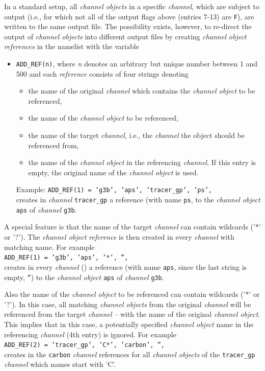 \documentclass[twoside]{article}
\begin{document}
{In a standard setup, all {\it channel objects} in a specific {\it channel},
which are subject to output (i.e., for which not all of the output flags
above (entries 7-13) are {\tt F}),
are written to the same output file. The possibility exists,
however, to re-direct the output of {\it channel objects} into different
output files by creating {\it channel object references} in the namelist with
the variable
\begin{itemize}
 \item {\tt ADD\_REF(n)}, where {\it n} denotes an arbitrary but unique
 number between 1 and 500 and each {\it reference} consists of four strings
 denoting
  \begin{itemize}
  \item the name of the original {\it channel} which contains the
        {\it channel object} to be referenced,
  \item the name of the {\it channel object} to be referenced,
  \item the name of the target {\it channel}, i.e., the {\it channel}
        the object should be referenced from,
  \item the name of the {\it channel object} in the referencing {\it channel}.
        If this entry is empty, the original name of the {\it channel object}
        is used.
  \end{itemize}
  Example: {\tt ADD\_REF(1) = 'g3b', 'aps', 'tracer\_gp', 'ps',}\\
  creates in {\it channel} {\tt tracer\_gp} a reference (with name {\tt ps},
  to the {\it channel object} {\tt aps} of {\it channel} {\tt g3b}.
\end{itemize}
%
A special feature is that the name of the target {\it channel} can contain
wildcards ('*' or '?'). The {\it channel object reference} is then created
in every {\it channel} with matching name. For example\\
{\tt ADD\_REF(1) = 'g3b', 'aps', '*', '',}\\
creates in every {\it channel} ({\tt *}) a reference (with name {\tt aps},
since the last string is empty, {\tt ''}) to the {\it channel object}
{\tt aps} of {\it channel} {\tt g3b}.

Also the name of the {\it channel object} to be referenced can contain
wildcards ('*' or '?'). In this case, all matching {\it channel objects}
from the original {\it channel} will be referenced from the target
{\it channel} -- with the name of the original {\it channel object}.
This implies that in this case, a potentially
specified {\it channel object} name in the referencing {\it channel}
(4th entry) is ignored. For example\\
{\tt ADD\_REF(2) = 'tracer\_gp', 'C*', 'carbon', '',}\\
creates in the {\tt carbon} {\it channel} references for all
{\it channel objects} of the {\tt tracer\_gp} {\it channel} which names start
with 'C'.

}
\end{document}
